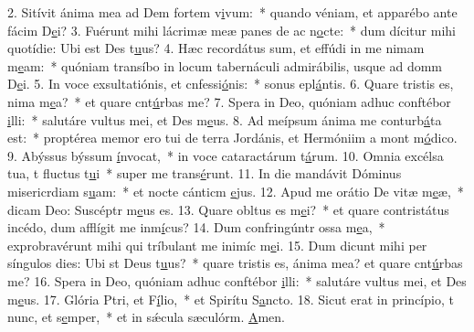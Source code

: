 2. Sitívit ánima mea ad Dem fortem v\uline{i}vum:~* quando véniam, et apparébo ante fácim D\uline{e}i?
3. Fuérunt mihi lácrimæ meæ panes de ac n\uline{o}cte:~* dum dícitur mihi quotídie: Ubi est Des t\uline{u}us?
4. Hæc recordátus sum, et effúdi in me nimam m\uline{e}am:~* quóniam transíbo in locum tabernáculi admirábilis, usque ad domm D\uline{e}i.
5. In voce exsultatiónis, et cnfessi\uline{ó}nis:~* sonus epl\uline{á}ntis.
6. Quare tristis es, nima m\uline{e}a?~* et quare cnt\uline{ú}rbas me?
7. Spera in Deo, quóniam adhuc conftébor \uline{i}lli:~* salutáre vultus mei, et Des m\uline{e}us.
8. Ad meípsum ánima me conturb\uline{á}ta est:~* proptérea memor ero tui de terra Jordánis, et Hermóniim a mont m\uline{ó}dico.
9. Abýssus býssum \uline{í}nvocat,~* in voce cataractárum t\uline{á}rum.
10. Omnia excélsa tua, t fluctus t\uline{u}i~* super me trans\uline{é}runt.
11. In die mandávit Dóminus misericrdiam s\uline{u}am:~* et nocte cánticm \uline{e}jus.
12. Apud me orátio De vitæ m\uline{e}æ,~* dicam Deo: Suscéptr m\uline{e}us es.
13. Quare obltus es m\uline{e}i?~* et quare contristátus incédo, dum afflígit me inm\uline{í}cus?
14. Dum confringúntr ossa m\uline{e}a,~* exprobravérunt mihi qui tríbulant me inimíc m\uline{e}i.
15. Dum dicunt mihi per síngulos dies: Ubi st Deus t\uline{u}us?~* quare tristis es, ánima mea? et quare cnt\uline{ú}rbas me?
16. Spera in Deo, quóniam adhuc conftébor \uline{i}lli:~* salutáre vultus mei, et Des m\uline{e}us.
17. Glória Ptri, et F\uline{í}lio,~* et Spirítu S\uline{a}ncto.
18. Sicut erat in princípio, t nunc, et s\uline{e}mper,~* et in sǽcula sæculórm. \uline{A}men.
